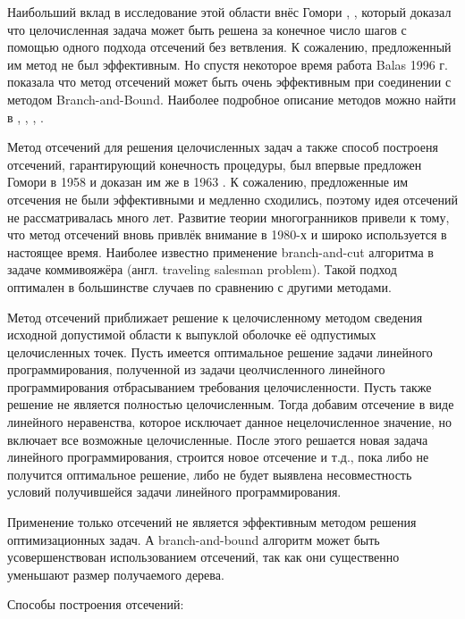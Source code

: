 \documentclass[a4paper,14pt,russian]{extreport}
\begin{document}
Наибольший вклад в исследование этой области внёс Гомори \cite{gomory}, \cite{gomory_1}, который доказал что целочисленная задача может быть решена за конечное число шагов с помощью одного подхода отсечений без ветвления. К сожалению, предложенный им метод не был эффективным. Но спустя некоторое время работа Balas \cite{balas_ceria_corn_natraj} 1996 г. показала что метод отсечений может быть очень эффективным при соединении с методом Branch-and-Bound. Наиболее подробное описание методов можно найти в \cite{klar}, \cite{wolter}, \cite{marchand}, \cite{fuegenschuh}.
\par Метод отсечений для решения целочисленных задач а также способ построеня отсечений, гарантирующий конечность процедуры, был впервые предложен Гомори в 1958 \cite{gomory_1} и доказан им же в 1963 \cite{gomory}. К сожалению, предложенные им отсечения не были эффективными и медленно сходились, поэтому идея отсечений не рассматривалась много лет. Развитие теории многогранников привели к тому, что метод отсечений вновь привлёк внимание в 1980-х и широко используется в настоящее время. Наиболее известно применение branch-and-cut алгоритма в задаче коммивояжёра (англ. traveling salesman problem). Такой подход оптимален в большинстве случаев по сравнению с другими методами. 
\par Метод отсечений приближает решение к целочисленному методом сведения исходной допустимой области к выпуклой оболочке её одпустимых целочисленных точек. Пусть имеется оптимальное решение задачи линейного программирования, полученной из задачи цеолчисленного линейного программирования отбрасыванием требования целочисленности. Пусть также решение не является полностью целочисленным. Тогда добавим отсечение в виде линейного неравенства, которое исключает данное нецелочисленное значение, но включает все возможные целочисленные. После этого решается новая задача линейного программирования, строится новое отсечение и т.д., пока либо не получится оптимальное решение, либо не будет выявлена несовместность условий получившейся задачи линейного программирования. 
\par Применение только отсечений не является эффективным методом решения оптимизационных задач. А branch-and-bound алгоритм может быть усовершенствован использованием отсечений, так как они существенно уменьшают размер получаемого дерева.
\par Способы построения отсечений:
\end{document}
